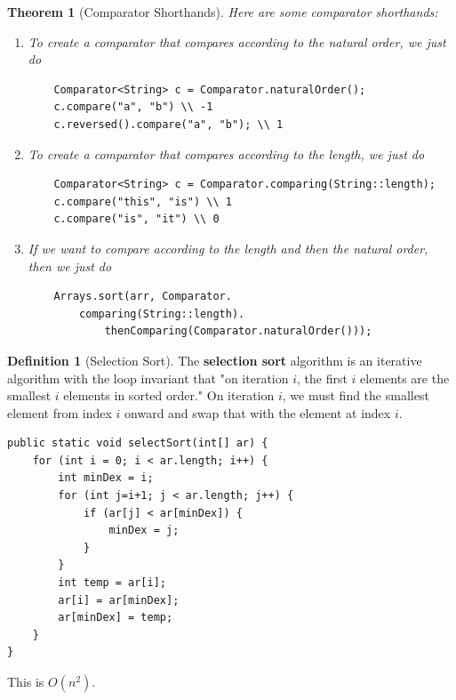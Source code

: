 \documentclass{article}
\newtheorem{theorem}{Theorem}[section]
\theoremstyle{definition}
\theoremstyle{remark}
\theoremstyle{definition}
\newtheorem{definition}{Definition}[section]
\begin{document}
\begin{theorem}[Comparator Shorthands]
Here are some comparator shorthands: 
\begin{enumerate}
    \item To create a comparator that compares according to the natural order, we just do 
    \begin{verbatim}
    Comparator<String> c = Comparator.naturalOrder(); 
    c.compare("a", "b") \\ -1 
    c.reversed().compare("a", "b"); \\ 1
    \end{verbatim}
    
    \item To create a comparator that compares according to the length, we just do 
    \begin{verbatim}
    Comparator<String> c = Comparator.comparing(String::length); 
    c.compare("this", "is") \\ 1 
    c.compare("is", "it") \\ 0 
    \end{verbatim}
    
    \item If we want to compare according to the length and then the natural order, then we just do 
    \begin{verbatim}
    Arrays.sort(arr, Comparator.
        comparing(String::length).
            thenComparing(Comparator.naturalOrder())); 
    \end{verbatim}
\end{enumerate}
\end{theorem}

\begin{definition}[Selection Sort]
The \textbf{selection sort} algorithm is an iterative algorithm with the loop invariant that "on iteration $i$, the first $i$ elements are the smallest $i$ elements in sorted order." On iteration $i$, we must find the smallest element from index $i$ onward and swap that with the element at index $i$. 
\begin{verbatim}
public static void selectSort(int[] ar) {
    for (int i = 0; i < ar.length; i++) {
        int minDex = i; 
        for (int j=i+1; j < ar.length; j++) {
            if (ar[j] < ar[minDex]) {
                minDex = j; 
            }
        }
        int temp = ar[i]; 
        ar[i] = ar[minDex]; 
        ar[minDex] = temp; 
    }
}
\end{verbatim}
This is $O(n^2)$. 
\end{definition}
\end{document}
